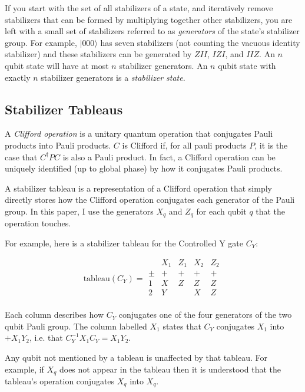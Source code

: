 \documentclass[onecolumn,unpublished]{quantumarticle}
\theoremstyle{definition}
\theoremstyle{definition}
\theoremstyle{definition}
\begin{document}
If you start with the set of all stabilizers of a state, and iteratively remove stabilizers that can be formed by multiplying together other stabilizers, you are left with a small set of stabilizers referred to as {\em generators} of the state's stabilizer group.
For example, $|000\rangle$ has seven stabilizers (not counting the vacuous identity stabilizer) and these stabilizers can be generated by $ZII$, $IZI$, and $IIZ$.
An $n$ qubit state will have at most $n$ stabilizer generators.
An $n$ qubit state with exactly $n$ stabilizer generators is a {\em stabilizer state}.


\subsection{Stabilizer Tableaus}

A {\em Clifford operation} is a unitary quantum operation that conjugates Pauli products into Pauli products.
$C$ is Clifford if, for all pauli products $P$, it is the case that $C^\dagger P C$ is also a Pauli product.
In fact, a Clifford operation can be uniquely identified (up to global phase) by how it conjugates Pauli products.

A stabilizer tableau is a representation of a Clifford operation that simply directly stores how the Clifford operation conjugates each generator of the Pauli group.
In this paper, I use the generators $X_q$ and $Z_q$ for each qubit $q$ that the operation touches.

For example, here is a stabilizer tableau for the Controlled Y gate $C_Y$:

$$
\text{tableau}(C_Y) = \begin{array}{r|cc|cc}
    & X_1 & Z_1 & X_2 & Z_2   \\
    \hline
    \pm & + & + & + & + \\
    1 & X & Z & Z & Z \\
    2 & Y &   & X & Z \\
\end{array}
$$

Each column describes how $C_Y$ conjugates one of the four generators of the two qubit Pauli group.
The column labelled $X_1$ states that $C_Y$ conjugates $X_1$ into $+X_1 Y_2$, i.e. that $C_Y^{-1} X_1 C_Y = X_1 Y_2$.

Any qubit not mentioned by a tableau is unaffected by that tableau.
For example, if $X_q$ does not appear in the tableau then it is understood that the tableau's operation conjugates $X_q$ into $X_q$.
\end{document}
